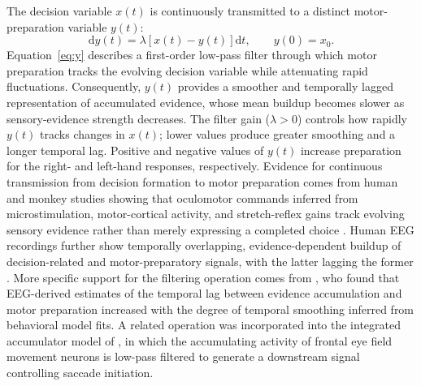 \documentclass[a4paper,11pt]{article}
\theoremstyle{definition}
\newcommand{\dd}{\mathrm d}
\newcommand{\1}{\mathbbm{1}}
\begin{document}
The decision variable $x(t)$ is continuously transmitted to a distinct motor-preparation variable $y(t)$:
\begin{equation}
\dd y(t)=\lambda\left[x(t)-y(t)\right]\dd t, \qquad y(0)=x_{0}.
\label{eq:y}
\end{equation}
Equation~\eqref{eq:y} describes a first-order low-pass filter through which motor preparation tracks the evolving decision variable while attenuating rapid fluctuations. Consequently, $y(t)$ provides a smoother and temporally lagged representation of accumulated evidence, whose mean buildup becomes slower as sensory-evidence strength decreases. The filter gain ($\lambda>0$) controls how rapidly $y(t)$ tracks changes in $x(t)$; lower values produce greater smoothing and a longer temporal lag. Positive and negative values of $y(t)$ increase preparation for the right- and left-hand responses, respectively. Evidence for continuous transmission from decision formation to motor preparation comes from human and monkey studies showing that oculomotor commands inferred from microstimulation, motor-cortical activity, and stretch-reflex gains track evolving sensory evidence rather than merely expressing a completed choice \parencites[e.g.,][]{donnerBuildupChoicePredictiveActivity2009}{goldRepresentationPerceptualDecision2000}{selenDeliberationMotorSystem2012}. Human EEG recordings further show temporally overlapping, evidence-dependent buildup of decision-related and motor-preparatory signals, with the latter lagging the former \parencite{kellyInternalExternalInfluences2013}. More specific support for the filtering operation comes from \textcite{balsdonSecondaryMotorIntegration2023}, who found that EEG-derived estimates of the temporal lag between evidence accumulation and motor preparation increased with the degree of temporal smoothing inferred from behavioral model fits. A related operation was incorporated into the integrated accumulator model of \textcite{heitzNeuralMechanismsSpeedAccuracy2012}, in which the accumulating activity of frontal eye field movement neurons is low-pass filtered to generate a downstream signal controlling saccade initiation.
\end{document}
